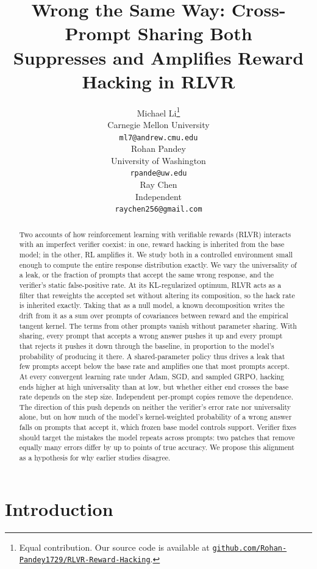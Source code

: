 \documentclass{article}
\title{Wrong the Same Way: Cross-Prompt Sharing Both\\Suppresses and Amplifies Reward Hacking in RLVR}
\author{%
  Michael Li\thanks{Equal contribution. Our source code is available at \href{https://github.com/Rohan-Pandey1729/RLVR-Reward-Hacking}{\nolinkurl{github.com/Rohan-Pandey1729/RLVR-Reward-Hacking}}.} \\
  Carnegie Mellon University \\
  \texttt{ml7@andrew.cmu.edu} \\
  \And
  Rohan Pandey\footnotemark[1] \\
  University of Washington \\
  \texttt{rpande@uw.edu} \\
  \And
  Ray Chen\footnotemark[1] \\
  Independent \\
  \texttt{raychen256@gmail.com} \\
}
\theoremstyle{definition}
\begin{document}
\maketitle

\begin{abstract}
Two accounts of how reinforcement learning with verifiable rewards (RLVR) interacts with an imperfect verifier coexist: in one, reward hacking is inherited from the base model; in the other, RL amplifies it. We study both in a controlled environment small enough to compute the entire response distribution exactly. We vary the universality of a leak, or the fraction of prompts that accept the same wrong response, and the verifier's static false-positive rate. At its KL-regularized optimum, RLVR acts as a filter that reweights the accepted set without altering its composition, so the hack rate is inherited exactly. Taking that as a null model, a known decomposition writes the drift from it as a sum over prompts of covariances between reward and the empirical tangent kernel. The terms from other prompts vanish without parameter sharing. With sharing, every prompt that accepts a wrong answer pushes it up and every prompt that rejects it pushes it down through the baseline, in proportion to the model's probability of producing it there. A shared-parameter policy thus drives a leak that few prompts accept below the base rate and amplifies one that most prompts accept. At every convergent learning rate under Adam, SGD, and sampled GRPO, hacking ends higher at high universality than at low, but whether either end crosses the base rate depends on the step size. Independent per-prompt copies remove the dependence. The direction of this push depends on neither the verifier's error rate nor universality alone, but on how much of the model's kernel-weighted probability of a wrong answer falls on prompts that accept it, which frozen base model controls support. Verifier fixes should target the mistakes the model repeats across prompts: two patches that remove equally many errors differ by up to \NuFiveCGapHiLr{} points of true accuracy. We propose this alignment as a hypothesis for why earlier studies disagree.
\end{abstract}

\section{Introduction}
\end{document}
